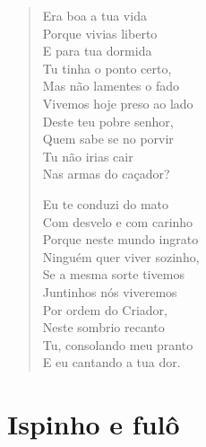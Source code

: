 \begin{verse}
Era boa a tua vida\\
Porque vivias liberto\\
E para tua dormida\\
Tu tinha o ponto certo,\\
Mas não lamentes o fado\\
Vivemos hoje preso ao lado\\
Deste teu pobre senhor,\\
Quem sabe se no porvir\\
Tu não irias cair\\
Nas armas do caçador?

Eu te conduzi do mato\\
Com desvelo e com carinho\\
Porque neste mundo ingrato\\
Ninguém quer viver sozinho,\\
Se a mesma sorte tivemos\\
Juntinhos nós viveremos\\
Por ordem do Criador,\\
Neste sombrio recanto\\
Tu, consolando meu pranto\\
E eu cantando a tua dor.
\end{verse}

\chapter{Ispinho e fulô}

